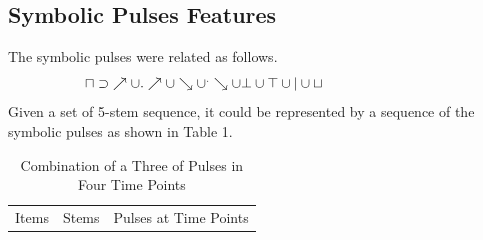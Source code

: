 \documentclass[10pt,journal]{IEEEtran}
\begin{document}
\subsection{Symbolic Pulses Features}
The symbolic pulses were related as follows.  
\begin{equation}
 \begin{minipage}{250pt}
\begin{flushleft} $\displaystyle \sqcap\supset {\nearrow\cup.\nearrow\cup\searrow\cup^.\searrow\cup\bot\cup\top\cup|\cup\sqcup}$  \end{flushleft}
 \end{minipage}
 \end{equation}
Given a set of 5-stem sequence, it could be represented by a sequence of    the symbolic pulses as shown in Table 1.
\begin{table}[H] \caption{Combination of a Three of Pulses in Four Time Points}\centering\begin{tabular}{|p{.5cm}|p{1.5cm}|p{3.85cm}|}\hline Items&Stems     &Pulses at Time Points \\ \end{tabular} \\ 

\end{table}
\end{document}
